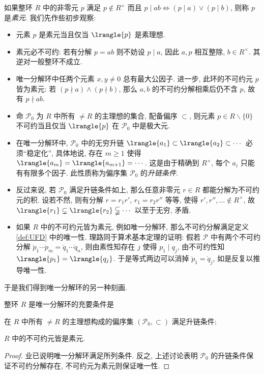 如果整环 $R$ 中的非零元 $p$ 满足 $p \notin R^\times$ 而且 $p \mid ab \iff (p \mid a) \vee (p \mid b)$, 则称 $p$ 是\emph{素元}. 我们先作些初步观察:
\begin{itemize}
	\item 元素 $p$ 是素元当且仅当 $\lrangle{p}$ 是素理想.
	\item 素元必不可约: 若有分解 $p=ab$ 则不妨设 $p \mid a$, 因此 $a,p$ 相互整除, $b \in R^\times$. 其逆对一般整环不成立.
	\item 唯一分解环中任两个元素 $x,y \neq 0$ 总有最大公因子. 进一步, 此环的不可约元 $p$ 皆为素元: 若 $(p \nmid a) \wedge (p \nmid b)$, 那么 $a,b$ 的不可约分解相乘后仍不含 $p$, 故有 $p \nmid ab$.
	\item 命 $\mathcal{P}_0$ 为 $R$ 中所有 $\neq R$ 的主理想的集合, 配备偏序 $\subset$, 则元素 $p \in R \smallsetminus \{0\}$ 不可约当且仅当 $\lrangle{p}$ 在 $\mathcal{P}_0$ 中是极大元.
	\item 在唯一分解环中, $\mathcal{P}_0$ 中的无穷升链 $\lrangle{a_1} \subset \lrangle{a_2} \subset \cdots$ 必须``稳定化'', 具体地说, 存在 $m \geq 1$ 使得 $\lrangle{a_m} = \lrangle{a_{m+1}} = \cdots$. 这是由于精确到 $R^\times$, 每个 $a_i$ 只能有有限多个因子. 此性质称为偏序集 $\mathcal{P}_0$ 的\emph{升链条件}.
	\item 反过来说, 若 $\mathcal{P}_0$ 满足升链条件如上, 那么任意非零元 $r \in R$ 都能分解为不可约元的积. 设若不然, 则有分解 $r = r_1 r'$, $r_1 = r_2 r''$ 等等, 使得 $r', r'', \ldots \notin R^\times$, 故 $\lrangle{r_1} \subsetneq \lrangle{r_2} \subsetneqq \cdots$ 以至于无穷, 矛盾.
	\item 如果 $R$ 中的不可约元皆为素元, 例如唯一分解环, 那么不可约分解满足定义 \ref{def:UFD} 中的唯一性. 理路同于算术基本定理的证明: 假若 $\mathcal{P}$ 中有两个不可约分解 $\mathring{p}_1 \cdots \mathring{p}_m =  \mathring{q}_1 \cdots \mathring{q}_n$, 则由素性知存在 $j$ 使得 $p_1 \mid q_j$, 由不可约性知 $\lrangle{p_1} = \lrangle{q_j}$. 于是等式两边可以消掉 $\mathring{p}_1 = \mathring{q}_j$, 如是反复以推导唯一性.
\end{itemize}
于是我们得到唯一分解环的另一种刻画.

\begin{proposition}
	整环 $R$ 是唯一分解环的充要条件是
	\begin{compactitem}
		\item 在 $R$ 中所有 $\neq R$ 的主理想构成的偏序集 $(\mathcal{P}_0, \subset)$ 满足升链条件;
		\item $R$ 中的不可约元皆是素元.
	\end{compactitem}
\end{proposition}
\begin{proof}
	业已说明唯一分解环满足所列条件. 反之, 上述讨论表明 $\mathcal{P}_0$ 的升链条件保证不可约分解存在, 不可约元为素元则保证唯一性.
\end{proof}

